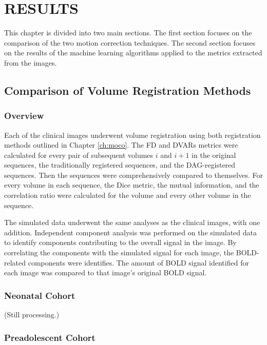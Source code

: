 \chapter{RESULTS}
\label{ch:results}

This chapter is divided into two main sections. The first section focuses on the comparison of the two motion correction techniques. The second section focuses on the results of the machine learning algorithms applied to the metrics extracted from the images.

\section{Comparison of Volume Registration Methods}

\subsection{Overview}

Each of the clinical images underwent volume registration using both registration methods outlined in Chapter \ref{ch:moco}. The FD and DVARs metrics were calculated for every pair of subsequent volumes $i$ and $i+1$ in the original sequences, the traditionally registered sequences, and the DAG-registered sequences. Then the sequences were comprehensively compared to themselves. For every volume in each sequence, the Dice metric, the mutual information, and the correlation ratio were calculated for the volume and every other volume in the sequence.

The simulated data underwent the same analyses as the clinical images, with one addition. Independent component analysis was performed on the simulated data to identify components contributing to the overall signal in the image. By correlating the components with the simulated signal for each image, the BOLD-related components were identifies. The amount of BOLD signal identified for each image was compared to that image's original BOLD signal.

\subsection{Neonatal Cohort}

(Still processing.)

\subsection{Preadolescent Cohort}




